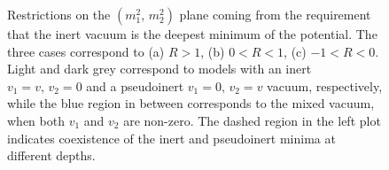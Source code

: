 \begin{figure}[htb]
\caption{Restrictions on the $(m_1^2,\, m_2^2)$ plane coming from the requirement that
the inert vacuum is the deepest minimum of the potential. The three cases correspond to (a) $R > 1$,
(b) $0 < R < 1$, (c) $-1 < R < 0$. Light and dark grey correspond to models 
with an inert $v_1 = v,\, v_2 = 0$ and a pseudoinert $v_1 = 0,\, v_2 = v$ vacuum,
respectively, while the blue region in between corresponds to the mixed vacuum,
when both $v_1$ and $v_2$ are non-zero. The dashed region in the left plot indicates coexistence
of the inert and pseudoinert minima at different depths.}
\label{fig:parameter-space}
\end{figure}

